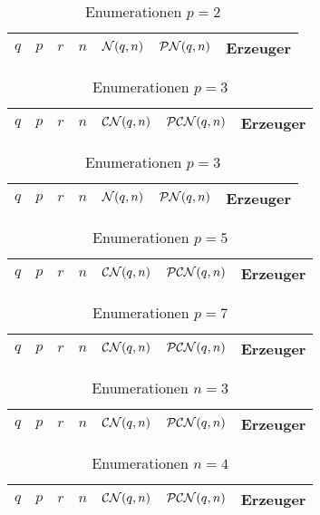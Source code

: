 \begin{longtable}[h]{llllllp{7cm}}
  \caption{Enumerationen $p=2$}\\
  $q$ & $p$ & $r$ & $n$ & $\cal N(q,n)$ & $\PN(q,n)$ & Erzeuger \\\hline
  \endhead
  
\end{longtable}

\begin{longtable}[h]{llllllp{7cm}}
  \caption{Enumerationen $p=3$}\\
  $q$ & $p$ & $r$ & $n$ & $\CN(q,n)$ & $\PCN(q,n)$ & Erzeuger \\\hline
  
\end{longtable}

\begin{longtable}[h]{llllllp{7cm}}
  \caption{Enumerationen $p=3$}\\
  $q$ & $p$ & $r$ & $n$ & $\cal N(q,n)$ & $\PN(q,n)$ & Erzeuger \\\hline
  \endhead
  
\end{longtable}

\begin{longtable}[h]{llllllp{7cm}}
  \caption{Enumerationen $p=5$}\\
  $q$ & $p$ & $r$ & $n$ & $\CN(q,n)$ & $\PCN(q,n)$ & Erzeuger \\\hline
  \endhead
  
\end{longtable}

\begin{longtable}[h]{llllllp{7cm}}
  \caption{Enumerationen $p=7$}\\
  $q$ & $p$ & $r$ & $n$ & $\CN(q,n)$ & $\PCN(q,n)$ & Erzeuger \\\hline
  \endhead
  
\end{longtable}

\begin{longtable}[h]{llllllp{7cm}}
  \caption{Enumerationen $n=3$}\\
  $q$ & $p$ & $r$ & $n$ & $\CN(q,n)$ & $\PCN(q,n)$ & Erzeuger \\\hline
  \endhead
  
\end{longtable}

\begin{longtable}[h]{llllllp{7cm}}
  \caption{Enumerationen $n=4$}\\
  $q$ & $p$ & $r$ & $n$ & $\CN(q,n)$ & $\PCN(q,n)$ & Erzeuger \\\hline
  \endhead
  
\end{longtable}

